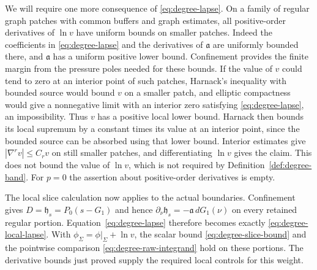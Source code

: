 We will require one more consequence of \eqref{eq:degree-lapse}.  On a
family of regular graph patches with common buffers and graph estimates,
all positive-order derivatives of $\ln v$ have uniform bounds on smaller
patches.  Indeed the coefficients in \eqref{eq:degree-lapse} and the
derivatives of $\mathfrak a$ are uniformly bounded there, and
$\mathfrak a$ has a uniform positive lower bound.  Confinement provides
the finite margin from the pressure poles needed for these bounds.  If
the value of $v$ could tend to zero at an interior point of such patches,
Harnack's inequality with bounded source would bound $v$ on a smaller
patch, and elliptic compactness would give a nonnegative limit with an
interior zero satisfying \eqref{eq:degree-lapse}, an impossibility.
Thus $v$ has a positive local lower bound.  Harnack then bounds its local
supremum by a constant times its value at an interior point, since the
bounded source can be absorbed using that lower bound.  Interior
estimates give $|\nabla^r v|\le C_r v$ on still smaller patches, and
differentiating $\ln v$ gives the claim.  This does not bound the value
of $\ln v$, which is not required by Definition~\ref{def:degree-band}.
For $p=0$ the assertion about positive-order derivatives is empty.

The local slice calculation now applies to the actual boundaries.
Confinement gives $D=\mathfrak h_s=P_0(s-G_1)$ and hence
$\partial_\nu\mathfrak h_s=-\mathfrak a\,dG_1(\nu)$ on every retained
regular portion.  Equation~\eqref{eq:degree-lapse} therefore becomes
exactly \eqref{eq:degree-local-lapse}.  With
$\phi_\Sigma=\phi|_\Sigma+\ln v$, the scalar bound
\eqref{eq:degree-slice-bound} and the pointwise comparison
\eqref{eq:degree-raw-integrand} hold on these portions.  The derivative
bounds just proved supply the required local controls for this weight.

